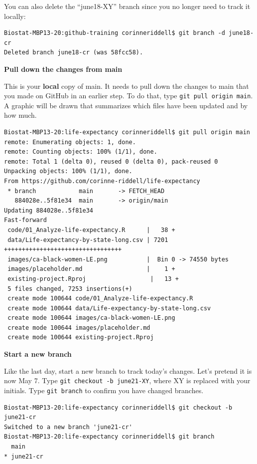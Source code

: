\documentclass[
]{book}
\begin{document}
You can also delete the ``june18-XY'' branch since you no longer need to track it
locally:

\begin{verbatim}
Biostat-MBP13-20:github-training corinneriddell$ git branch -d june18-cr
Deleted branch june18-cr (was 58fcc58).
\end{verbatim}

\textbf{Pull down the changes from main}

This is your \textbf{local} copy of main. It needs to pull down the changes to
main that you made on GitHub in an earlier step. To do that, type \texttt{git\ pull\ origin\ main}.
A graphic will be drawn that summarizes which files have been updated and by
how much.

\begin{verbatim}
Biostat-MBP13-20:life-expectancy corinneriddell$ git pull origin main
remote: Enumerating objects: 1, done.
remote: Counting objects: 100% (1/1), done.
remote: Total 1 (delta 0), reused 0 (delta 0), pack-reused 0
Unpacking objects: 100% (1/1), done.
From https://github.com/corinne-riddell/life-expectancy
 * branch            main       -> FETCH_HEAD
   884028e..5f81e34  main       -> origin/main
Updating 884028e..5f81e34
Fast-forward
 code/01_Analyze-life-expectancy.R      |   38 +
 data/Life-expectancy-by-state-long.csv | 7201 +++++++++++++++++++++++++++++++++
 images/ca-black-women-LE.png           |  Bin 0 -> 74550 bytes
 images/placeholder.md                  |    1 +
 existing-project.Rproj                  |   13 +
 5 files changed, 7253 insertions(+)
 create mode 100644 code/01_Analyze-life-expectancy.R
 create mode 100644 data/Life-expectancy-by-state-long.csv
 create mode 100644 images/ca-black-women-LE.png
 create mode 100644 images/placeholder.md
 create mode 100644 existing-project.Rproj
\end{verbatim}

\textbf{Start a new branch}

Like the last day, start a new branch to track today's changes. Let's
pretend it is now May 7. Type \texttt{git\ checkout\ -b\ june21-XY}, where XY is replaced
with your initials. Type \texttt{git\ branch} to confirm you have changed branches.

\begin{verbatim}
Biostat-MBP13-20:life-expectancy corinneriddell$ git checkout -b june21-cr
Switched to a new branch 'june21-cr'
Biostat-MBP13-20:life-expectancy corinneriddell$ git branch
  main
* june21-cr
\end{verbatim}
\end{document}

